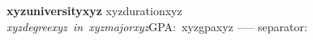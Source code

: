 \textbf{xyzuniversityxyz} \hfill xyzdurationxyz\\
\textit{xyzdegreexyz\ in\ xyzmajorxyz}\quad GPA:\ xyzgpaxyz
-----
separator: \vspace{6pt}
